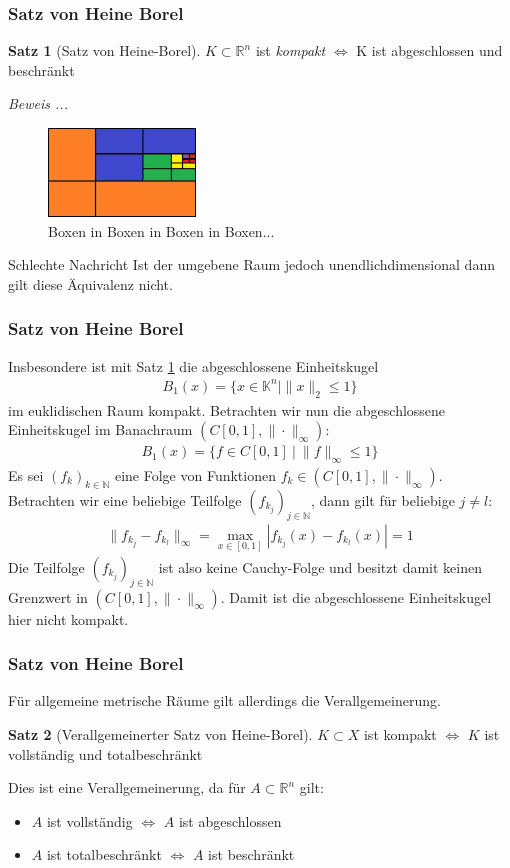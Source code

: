 \documentclass[t, handout]{beamer}
\newcommand{\N}{\mathbb{N}}
\newcommand{\R}{\mathbb{R}}
\newcommand{\K}{\mathbb{K}}
\theoremstyle{definition} %
\newtheorem{sa}{Satz}[section] %
\begin{document}
\begin{frame}
\frametitle{Satz von Heine Borel}
\begin{sa}[Satz von Heine-Borel]
\label{heine-borel}
$K \subset \R^n$ ist \textit{kompakt} $\Leftrightarrow$ K ist abgeschlossen und beschränkt
\end{sa}
\textit{Beweis ...}
\begin{figure}
\includegraphics[width=0.35\textwidth]{pictures/heine-borel-theorem.png}
\caption{Boxen in Boxen in Boxen in Boxen...}
\end{figure}
\pause
\begin{block}{Schlechte Nachricht}
Ist der umgebene Raum jedoch unendlichdimensional dann gilt diese Äquivalenz nicht.
\end{block}
\end{frame}

\begin{frame}
\frametitle{Satz von Heine Borel}
Insbesondere ist mit Satz \hyperref[heine-borel]{\ref*{heine-borel}} die abgeschlossene Einheitskugel
\begin{align*}
B_1(x) = \{x \in \K^n | \|x\|_2 \leq 1\}
\end{align*}
 im euklidischen Raum kompakt.
Betrachten wir nun die abgeschlossene Einheitskugel im Banachraum $(C[0,1], \|\cdot\|_\infty)$:
\begin{align*}
B_1(x) = \{f \in C[0,1] \: | \: \|f\|_\infty \leq 1\}
\end{align*}
Es sei ${(f_k)}_{k \in \N}$ eine Folge von Funktionen $f_k \in (C[0,1], \|\cdot\|_\infty)$. Betrachten wir eine beliebige Teilfolge ${(f_{k_j})}_{j \in \N}$, dann gilt für beliebige $j \neq l$:
\begin{align*}
\|f_{k_j} - f_{k_l}\|_\infty = \max_{x \in [0,1]}{|f_{k_j}(x) - f_{k_l}(x)|} = 1
\end{align*}
Die Teilfolge ${(f_{k_j})}_{j \in \N}$ ist also keine Cauchy-Folge und besitzt damit keinen Grenzwert in $(C[0,1], \|\cdot\|_\infty)$. Damit ist die abgeschlossene Einheitskugel hier nicht kompakt.
\end{frame}

\begin{frame}
\frametitle{Satz von Heine Borel}
Für allgemeine metrische Räume gilt allerdings die Verallgemeinerung.
\pause
\begin{sa}[Verallgemeinerter Satz von Heine-Borel]
$K \subset X$ ist kompakt $\Leftrightarrow$ $K$ ist vollständig und totalbeschränkt
\end{sa}
\pause
Dies ist eine Verallgemeinerung, da für $A \subset \R^n$ gilt:
\begin{itemize}
\item $A$ ist vollständig $\Leftrightarrow$ $A$ ist abgeschlossen
\item $A$ ist totalbeschränkt $\Leftrightarrow$ $A$ ist beschränkt
\end{itemize}
\end{frame}
\end{document}
